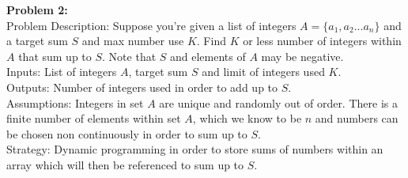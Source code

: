\documentclass{article}
\begin{document}
\textbf{Problem 2:}\\
Problem Description: Suppose you're given a list of integers $A = \{a_1, a_2...a_n\}$ and a target sum $S$ and max number use $K$. Find $K$ or less number of integers within $A$ that sum up to $S$. Note that $S$ and elements of $A$ may be negative. \\
Inputs: List of integers $A$, target sum $S$ and limit of integers used $K$.\\
Outputs: Number of integers used in order to add up to $S$.\\
Assumptions: Integers in set $A$ are unique and randomly out of order. There is a finite number of elements within set $A$, which we know to be $n$ and numbers can be chosen non continuously in order to sum up to $S$. \\ 
Strategy: Dynamic programming in order to store sums of numbers within an array which will then be referenced to sum up to $S$.\\
\end{document}
